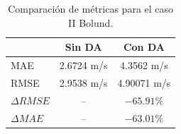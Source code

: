 \begin{table}[h!]
	\caption{Comparación de métricas para el caso II Bolund.}
	\label{tab:06_bol_mae_rmse}
	\centering%
	\begin{tabular}{lcc}
		\toprule
		& Sin DA & Con DA \\
		\midrule
		MAE & 2.6724 m/s & 4.3562 m/s \\
		RMSE & 2.9538 m/s& 4.90071 m/s\\
		$\Delta{RMSE}$&  -- & $-65.91\%$ \\
		$\Delta{MAE}$ &  -- & $-63.01\%$ \\
		\bottomrule
	\end{tabular}
\end{table}

